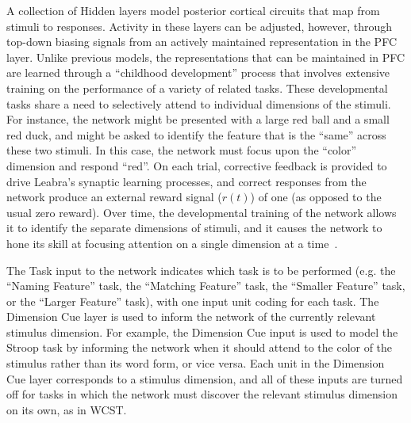 A collection of Hidden layers model posterior cortical circuits that
map from stimuli to responses.  Activity in these layers can be
adjusted, however, through top-down biasing signals from an actively
maintained representation in the PFC layer.  Unlike previous models,
the representations that can be maintained in PFC are learned through
a ``childhood development'' process that involves extensive training
on the performance of a variety of related tasks.  These developmental tasks
share a need to selectively attend to individual dimensions of the
stimuli.  For instance, the network might be presented with a large
red ball and a small red duck, and might be asked to identify the
feature that is the ``same'' across these two stimuli.  In this case,
the network must focus upon the ``color'' dimension and respond
``red''.  On each trial, corrective feedback is provided to drive
Leabra's synaptic learning processes, and correct responses from the
network produce an external reward signal ($r(t)$) of one (as opposed
to the usual zero reward).  Over time, the developmental training of
the network allows it to identify the separate dimensions of stimuli,
and it causes the network to hone its skill at focusing attention on a
single dimension at a time~\cite{RougierNP:2005:XT}.

The Task input to the network indicates which task is to be performed (e.g. the ``Naming Feature'' task, the ``Matching Feature'' task, the ``Smaller Feature'' task, or the ``Larger Feature'' task),
with one input unit coding for each task.  The Dimension Cue layer is
used to inform the network of the currently relevant stimulus
dimension.  For example, the Dimension Cue input is used to model the
Stroop task by informing the network when it should attend to the
color of the stimulus rather than its word form, or vice versa.  Each
unit in the Dimension Cue layer corresponds to a stimulus dimension,
and all of these inputs are turned off for tasks in which the network
must discover the relevant stimulus dimension on its own, as in WCST.


